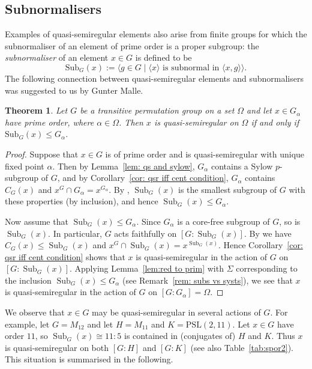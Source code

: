 \documentclass{article}
\newtheorem{thm}{Theorem}[section]
\theoremstyle{remark}
\theoremstyle{definition}
\DeclareMathOperator{\Sub}{Sub}
\newcommand{\PSL}{\mathrm{PSL}}
\newcommand{\qsr}{quasi-semiregular}
\newcommand{\qsres}{quasi-semiregular elements}
\begin{document}
 
{  
\subsection{Subnormalisers}

Examples of {\qsres} also arise from finite groups for which the subnormaliser of an element of prime order is a proper subgroup: the \emph{subnormaliser} of an element $x\in G$ is defined to be 
$$
\mathrm{Sub}_G(x):=\langle g\in G \mid \langle x \rangle\text{ is subnormal in }\langle x,g\rangle \rangle.
$$
The following connection between {\qsres} and subnormalisers was suggested to us by Gunter Malle.

\begin{thm}\label{l:subn}
Let $G$ be a transitive permutation group on a set $\Omega$ and let $x\in G_\alpha$ have prime order, where $\alpha \in \Omega$. Then $x$ is {\qsr} on $\Omega$ if and only if $\mathrm{Sub}_G(x) \leqslant G_\alpha$.
\end{thm}
\begin{proof}
    Suppose that $x\in G $ is of prime order and is {\qsr} with unique fixed point $\alpha$. Then by Lemma~\ref{lem: qs and sylow}, $G_\alpha$ contains a Sylow $p$-subgroup of $G$, and by Corollary~\ref{cor: qsr iff cent condition}, $G_\alpha$ contains $C_G(x)$ and $x^G \cap G_\alpha = x^{G_\alpha}$. By \cite[Corollary 2.10]{Malle}, $\Sub_G(x)$ is the smallest subgroup of $G$ with these properties (by inclusion), and hence $\Sub_G(x) \leqslant G_\alpha$. 

Now assume that $\Sub_G(x) \leqslant G_\alpha$. Since $G_\alpha$ is a core-free subgroup of $G$, so is $\Sub_G(x)$. In particular, $G$ acts faithfully on $[G:\Sub_G(x)]$. By \cite[Corollary 2.10]{Malle} we have $C_G(x) \leqslant \Sub_G(x)$ and  $x^G \cap \Sub_G(x) = x^{\Sub_G(x)}$. Hence Corollary~\ref{cor: qsr iff cent condition} shows that $x$ is {\qsr} in the action of $G$ on $[G:\Sub_G(x)]$. Applying Lemma~\ref{lem:red to prim} with $\Sigma$ corresponding to the inclusion $\Sub_G(x) \leqslant G_\alpha$ (see Remark~\ref{rem: subs vs systs}), we see that $x$ is {\qsr} in the action of $G$ on $[G:G_\alpha]=\Omega$.
\end{proof}

We observe that $x \in G$ may be {\qsr} in several actions of $G$. For example, let $G=M_{12}$ and let $H=M_{11}$ and $K=\PSL(2,11)$. Let $x\in G$ have order $11$, so $\Sub_G(x)\cong 11:5$ is contained in (conjugates of) $H$ and $K$. Thus $x$ is {\qsr} on both $[G:H]$ and $[G:K]$ (see also Table~\ref{tab:spor2}). This situation is summarised in the following.

}
\end{document}
